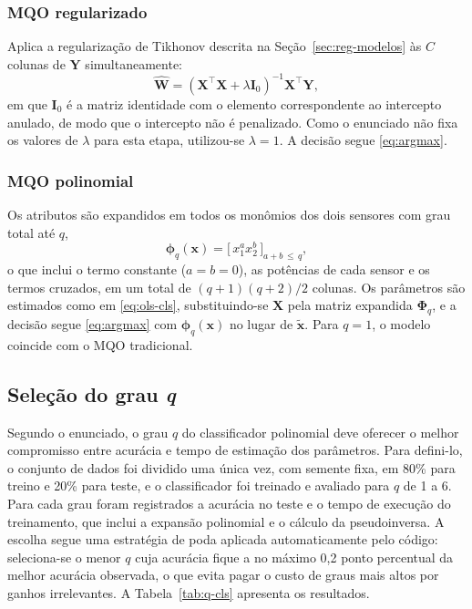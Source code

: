 \documentclass[conference]{IEEEtran}
\begin{document}
\subsubsection{MQO regularizado}

Aplica a regularização de Tikhonov descrita na Seção~\ref{sec:reg-modelos} às
$C$ colunas de $\mathbf{Y}$ simultaneamente:
\begin{equation}
\hat{\mathbf{W}} = (\mathbf{X}^{\top}\mathbf{X} + \lambda \mathbf{I}_0)^{-1}\mathbf{X}^{\top}\mathbf{Y},
\label{eq:ridge-cls}
\end{equation}
em que $\mathbf{I}_0$ é a matriz identidade com o elemento correspondente ao
intercepto anulado, de modo que o intercepto não é penalizado. Como o
enunciado não fixa os valores de $\lambda$ para esta etapa, utilizou-se
$\lambda = 1$. A decisão segue \eqref{eq:argmax}.

\subsubsection{MQO polinomial}

Os atributos são expandidos em todos os monômios dos dois sensores com grau
total até $q$,
\begin{equation}
\boldsymbol{\phi}_q(\mathbf{x}) = \big[\, x_1^{a} x_2^{b} \,\big]_{a + b \,\le\, q},
\label{eq:poly-cls}
\end{equation}
o que inclui o termo constante ($a = b = 0$), as potências de cada sensor e os
termos cruzados, em um total de $(q+1)(q+2)/2$ colunas. Os parâmetros são
estimados como em \eqref{eq:ols-cls}, substituindo-se $\mathbf{X}$ pela matriz
expandida $\boldsymbol{\Phi}_q$, e a decisão segue \eqref{eq:argmax} com
$\boldsymbol{\phi}_q(\mathbf{x})$ no lugar de $\tilde{\mathbf{x}}$. Para
$q = 1$, o modelo coincide com o MQO tradicional.

\subsection{Seleção do grau \textit{q}}
\label{sec:cls-q}

Segundo o enunciado, o grau $q$ do classificador polinomial deve oferecer o
melhor compromisso entre acurácia e tempo de estimação dos parâmetros. Para
defini-lo, o conjunto de dados foi dividido uma única vez, com semente fixa, em
80\% para treino e 20\% para teste, e o classificador foi treinado e avaliado
para $q$ de 1 a 6. Para cada grau foram registrados a acurácia no teste e o
tempo de execução do treinamento, que inclui a expansão polinomial e o cálculo
da pseudoinversa. A escolha segue uma estratégia de poda aplicada
automaticamente pelo código: seleciona-se o menor $q$ cuja acurácia fique a no
máximo 0,2 ponto percentual da melhor acurácia observada, o que evita pagar o
custo de graus mais altos por ganhos irrelevantes. A
Tabela~\ref{tab:q-cls} apresenta os resultados.
\end{document}
